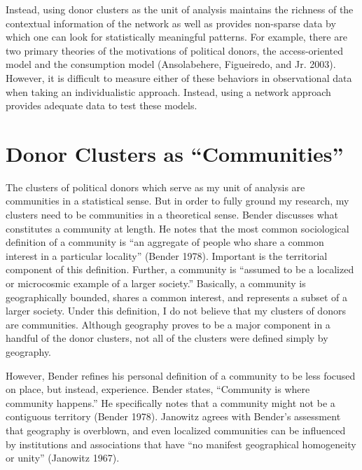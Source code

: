 \documentclass[12pt,]{article}
\begin{document}
Instead, using donor clusters as the unit of analysis maintains the
richness of the contextual information of the network as well as
provides non-sparse data by which one can look for statistically
meaningful patterns. For example, there are two primary theories of the
motivations of political donors, the access-oriented model and the
consumption model (Ansolabehere, Figueiredo, and Jr. 2003). However, it
is difficult to measure either of these behaviors in observational data
when taking an individualistic approach. Instead, using a network
approach provides adequate data to test these models.

\hypertarget{donor-clusters-as-communities}{%
\section{Donor Clusters as
``Communities''}\label{donor-clusters-as-communities}}

The clusters of political donors which serve as my unit of analysis are
communities in a statistical sense. But in order to fully ground my
research, my clusters need to be communities in a theoretical sense.
Bender discusses what constitutes a community at length. He notes that
the most common sociological definition of a community is ``an aggregate
of people who share a common interest in a particular locality'' (Bender
1978). Important is the territorial component of this definition.
Further, a community is ``assumed to be a localized or microcosmic
example of a larger society.'' Basically, a community is geographically
bounded, shares a common interest, and represents a subset of a larger
society. Under this definition, I do not believe that my clusters of
donors are communities. Although geography proves to be a major
component in a handful of the donor clusters, not all of the clusters
were defined simply by geography.

However, Bender refines his personal definition of a community to be
less focused on place, but instead, experience. Bender states,
``Community is where community happens.'' He specifically notes that a
community might not be a contiguous territory (Bender 1978). Janowitz
agrees with Bender's assessment that geography is overblown, and even
localized communities can be influenced by institutions and associations
that have ``no manifest geographical homogeneity or unity'' (Janowitz
1967).
\end{document}
